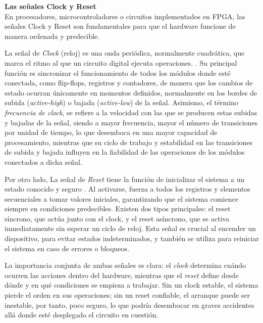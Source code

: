 \vspace{0.4em} %

\begin{adjustwidth}{1.5cm}{}
\textbf{Las señales Clock y Reset} \vspace{0.25cm} \\
En procesadores, microcontroladores o circuitos implementados en FPGA, las señales Clock y Reset son fundamentales para que el hardware funcione de manera ordenada y predecible.

La señal de \emph{Clock} (reloj) es una onda periódica, normalmente cuadrática, que marca el ritmo al que un circuito digital ejecuta operaciones. \cite{weste2015cmos} \cite{harris2021digital}. Su principal función es sincronizar el funcionamiento de todos los módulos donde esté conectada, como flip-flops, registros y contadores, de manera que los cambios de estado ocurran únicamente en momentos definidos, normalmente en los bordes de subida (\textit{active-high}) o bajada (\textit{active-low}) de la señal. Asimismo, el término  \emph{frecuencia de clock}, se refiere a la velocidad con las que se producen estas subidas y bajadas de la señal, siendo a mayor frecuencia, mayor el número de transiciones por unidad de tiempo, lo que desemboca en una mayor capacidad de procesamiento, mientras que su ciclo de trabajo y estabilidad en las transiciones de subida y bajada influyen en la fiabilidad de las operaciones de los módulos conectados a dicha señal. 

Por otro lado, La señal de \emph{Reset} tiene la función de inicializar el sistema a un estado conocido y seguro \cite{resetTechniques}. Al activarse, fuerza a todos los registros y elementos secuenciales a tomar valores iniciales, garantizando que el sistema comience siempre en condiciones predecibles. Existen dos tipos principales: el reset síncrono, que actúa junto con el clock, y el reset asíncrono, que se activa inmediatamente sin esperar un ciclo de reloj. Esta señal es crucial al encender un dispositivo, para evitar estados indeterminados, y también se utiliza para reiniciar el sistema en caso de errores o bloqueos.

La importancia conjunta de ambas señales es clara: el \textit{clock} determina cuándo ocurren las acciones dentro del hardware, mientras que el \textit{reset} define desde dónde y en qué condiciones se empieza a trabajar. Sin un clock estable, el sistema pierde el orden en sus operaciones; sin un reset confiable, el arranque puede ser inestable, por tanto, poco seguro, lo que podría desembocar en graves accidentes allá donde esté desplegado el circuito en cuestión.
\end{adjustwidth}

